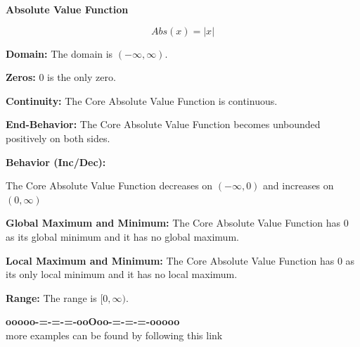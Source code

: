 \documentclass{ximera}
\begin{document}
\begin{explanation} \textbf{\textcolor{red!75!green}{Absolute Value Function}} 


\[ Abs(x) = |x|  \]



\textbf{Domain:} The domain is $(-\infty, \infty)$.

\textbf{Zeros:} $0$ is the only zero.




\textbf{Continuity:} The Core Absolute Value Function is continuous.

\textbf{End-Behavior:} The Core Absolute Value Function becomes unbounded positively on both sides.






\textbf{Behavior (Inc/Dec):} 

The Core Absolute Value Function decreases on $(-\infty, 0)$ and increases on $(0, \infty)$







\textbf{Global Maximum and Minimum:} The Core Absolute Value Function has $0$ as its global minimum and it has no global maximum.




\textbf{Local Maximum and Minimum:}  The Core Absolute Value Function has $0$ as its only local minimum and it has no local maximum.



\textbf{Range:} The range is $[0, \infty)$.

\end{explanation}






































\begin{center}
\textbf{\textcolor{green!50!black}{ooooo-=-=-=-ooOoo-=-=-=-ooooo}} \\

more examples can be found by following this link\\ 

\end{center}
\end{document}
